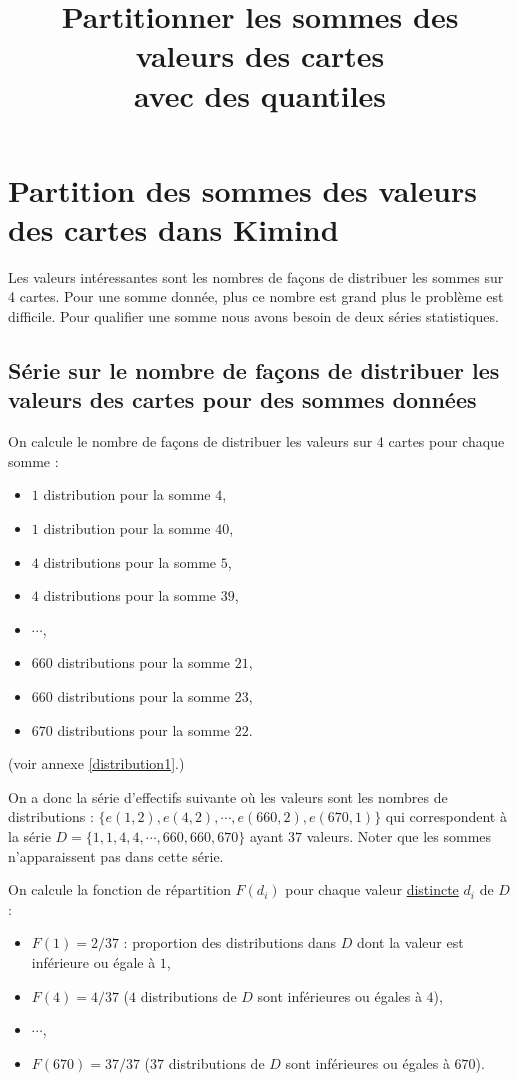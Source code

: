 \documentclass[a4paper, 12]{article}
\newcommand\set[1]{\ensuremath{\{#1\}}}
\begin{document}
\title{Partitionner les sommes des valeurs des cartes \\avec des quantiles}
\date{}
\maketitle


\section{Partition des sommes des valeurs des cartes dans Kimind}

Les valeurs intéressantes sont les nombres de façons de distribuer les sommes sur 4 cartes. Pour une somme donnée, plus ce nombre est grand plus le problème est difficile. Pour qualifier une somme nous avons besoin de deux séries statistiques.

\subsection{Série sur le nombre de façons de distribuer les valeurs des cartes pour des sommes données}

On calcule le nombre de façons de distribuer les valeurs sur 4 cartes pour chaque somme  :

\begin{itemize}
	\item $1$ distribution pour la somme $4$, 
	\item $1$ distribution pour la somme $40$,
	\item $4$ distributions pour la somme $5$,
	\item $4$ distributions pour la somme $39$,
	\item $\cdots$,
	\item $660$ distributions pour la somme $21$,
	\item $660$ distributions  pour la somme $23$,
	\item $670$ distributions pour la somme  $22$.
\end{itemize}
(voir annexe \ref{distribution1}.)

On a donc la série d'effectifs suivante où les valeurs sont les nombres de distributions  :
\set{e(1,2), e(4,2), \cdots, e(660, 2), e(670,1)} qui correspondent à la série 
$D = \set{1, 1, 4, 4, \cdots,660,660,670}$ ayant $37$ valeurs. Noter que les sommes n'apparaissent pas dans cette série.

On calcule la fonction de répartition $F(d_i)$ pour chaque valeur \underline{distincte} $d_i$ de $D$ :
\begin{itemize}
\item $F(1) = 2/37$ : proportion des distributions dans $D$ dont la valeur est inférieure ou égale à $1$,
\item $F(4) = 4/37$ ($4$ distributions de $D$ sont inférieures ou égales à $4$),
\item $\cdots$,
\item $F(670) = 37/37$ ($37$ distributions de $D$ sont inférieures ou égales à $670$).
\end{itemize}
\end{document}
